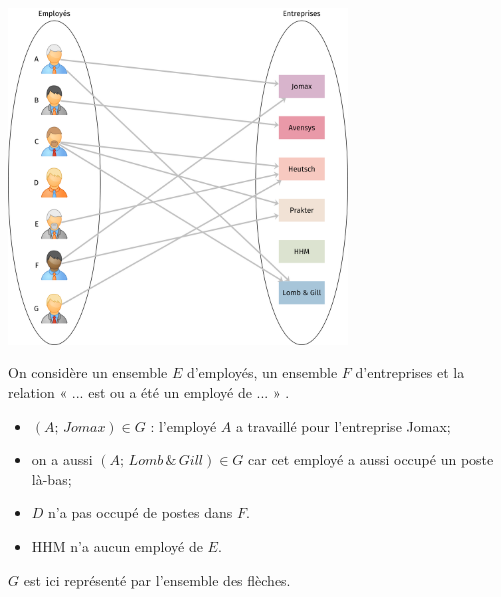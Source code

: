 \begin{exemple}
    \begin{center}
        \includegraphics[width=9cm]{ensembles/img/graphe_relation_binaire.png}
    \end{center}
    On considère un ensemble $E$ d'employés, un ensemble $F$ d'entreprises et la relation « ... est ou a été un employé de ... » .
    \begin{itemize}
        \item 	$(A;\,Jomax)\in G$ : l'employé $A$ a travaillé pour l'entreprise Jomax;
        \item 	on a aussi $(A;\,Lomb\,\&\,Gill)\in G$ car cet employé a aussi occupé un poste là-bas;
        \item 	$D$ n'a pas occupé de postes dans $F$.
        \item 	HHM n'a aucun employé de $E$.
    \end{itemize}
    $G$ est ici représenté par l'ensemble des flèches.
\end{exemple}

